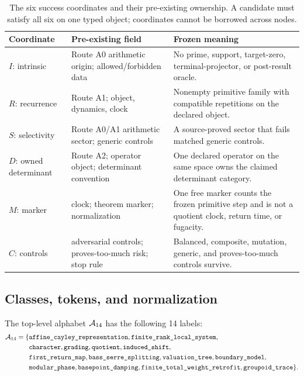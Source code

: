 \begin{table}[t]
\centering
\caption{The six success coordinates and their pre-existing ownership.  A
candidate must satisfy all six on one typed object; coordinates cannot be
borrowed across nodes.}
\label{tab:good}
\small
\begin{tabularx}{\textwidth}{@{}L{1.9cm}L{4.1cm}Y@{}}
\toprule
Coordinate & Pre-existing field & Frozen meaning \\
\midrule
$I$: intrinsic & Route A0 arithmetic origin; allowed/forbidden data & No prime,
support, target-zero, terminal-projector, or post-result oracle. \\
$R$: recurrence & Route A1; object, dynamics, clock & Nonempty primitive family
with compatible repetitions on the declared object. \\
$S$: selectivity & Route A0/A1 arithmetic sector; generic controls & A
source-proved sector that fails matched generic controls. \\
$D$: owned determinant & Route A2; operator object; determinant convention & One
declared operator on the same space owns the claimed determinant category. \\
$M$: marker & clock; theorem marker; normalization & One free marker counts the
frozen primitive step and is not a quotient clock, return time, or fugacity. \\
$C$: controls & adversarial controls; proves-too-much risk; stop rule & Balanced,
composite, mutation, generic, and proves-too-much controls survive. \\
\bottomrule
\end{tabularx}
\end{table}

\subsection{Classes, tokens, and normalization}

The top-level alphabet $\mathcal{A}_{14}$ has the following 14 labels:
{\footnotesize
\begin{align*}
\mathcal{A}_{14}=\{&\texttt{affine\_cayley\_representation},
            \texttt{finite\_rank\_local\_system},\\
          &\texttt{character},\texttt{grading},\texttt{quotient},
            \texttt{induced\_shift},\\
          &\texttt{first\_return\_map},\texttt{bass\_serre\_splitting},
            \texttt{valuation\_tree},\texttt{boundary\_model},\\
          &\texttt{modular\_phase},\texttt{basepoint\_damping},
            \texttt{finite\_total\_weight\_retrofit},\texttt{groupoid\_trace}\}.
\end{align*}
}

